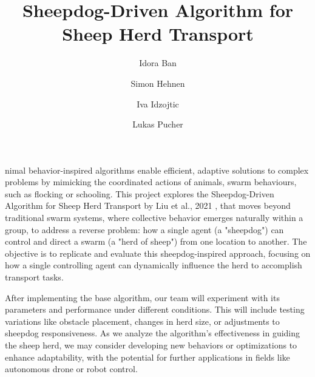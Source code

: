 \documentclass[9pt]{pnas-new}
\title{Sheepdog-Driven Algorithm for Sheep Herd Transport}
\author{Idora Ban}
\author{Simon Hehnen}
\author{Iva Idzojtic}
\author{Lukas Pucher}
\affil{Collective behaviour course research seminar report}
\begin{document}
\verticaladjustment{-2pt}

\maketitle
\thispagestyle{firststyle}


nimal behavior-inspired algorithms enable efficient, adaptive solutions to complex problems by mimicking the coordinated actions of animals, swarm behaviours, such as flocking or schooling. This project explores the Sheepdog-Driven Algorithm for Sheep Herd Transport by Liu et al., 2021 \cite{liu2021}, that moves beyond traditional swarm systems, where collective behavior emerges naturally within a group, to address a reverse problem: how a single agent (a "sheepdog") can control and direct a swarm (a "herd of sheep") from one location to another.
 The objective is to replicate and evaluate this sheepdog-inspired approach, focusing on how a single controlling agent can dynamically influence the herd to accomplish transport tasks.

After implementing the base algorithm, our team will experiment with its parameters and performance under different conditions. This will include testing variations like obstacle placement, changes in herd size, or adjustments to sheepdog responsiveness. As we analyze the algorithm’s effectiveness in guiding the sheep herd, we may consider developing new behaviors or optimizations to enhance adaptability, with the potential for further applications in fields like autonomous drone or robot control.

\end{document}
